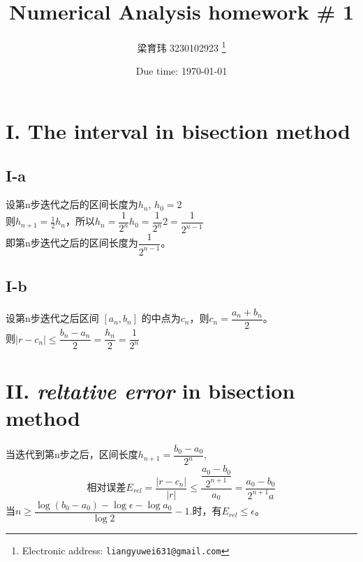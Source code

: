 \documentclass[a4paper]{article}
\begin{document}
\title{Numerical Analysis homework \# 1}

\author{梁育玮 3230102923
  \thanks{Electronic address: \texttt{liangyuwei631@gmail.com}}}


\date{Due time: \today}

\maketitle



\section*{I. The interval in bisection method}

\subsection*{I-a}

设第n步迭代之后的区间长度为$h_n$, $h_0 = 2$\\
\hspace*{2em}则$h_{n+1} = \frac{1}{2}h_n$，所以$h_n = \dfrac{1}{2^n}h_0 = \dfrac{1}{2^n}2 = \dfrac{1}{2^{n-1}}$
\\\hspace*{2em}即第n步迭代之后的区间长度为$\dfrac{1}{2^{n-1}}$。
\subsection*{I-b}
设第n步迭代之后区间 $[a_n, b_n]$ 的中点为$c_n$，则$c_n = \dfrac{a_n + b_n}{2}$。\\
\hspace*{2em}则$ |r - c_n| \leq \dfrac{b_n - a_n}{2} = \dfrac{h_n}{2} = \dfrac{1}{2^{n}}$

\section*{II. \emph{reltative error} in bisection method}
当迭代到第n步之后，区间长度$h_{n+1} = \dfrac{b_0 - a_0}{2^n}$,
\[相对误差E_{rel} = \dfrac{|r - c_n|}{|r|} \leq \dfrac{\dfrac{a_0 - b_0}{2^{n+1}}}{a_0} =  \dfrac{a_0 - b_0}{2^{n+1} a}
\]
\hspace*{2em}当$
n \geq \dfrac{\log(b_0 - a_0) - \log \epsilon - \log a_0}{\log 2} - 1.
$时，有$E_{rel} \leq \epsilon$。
\end{document}
